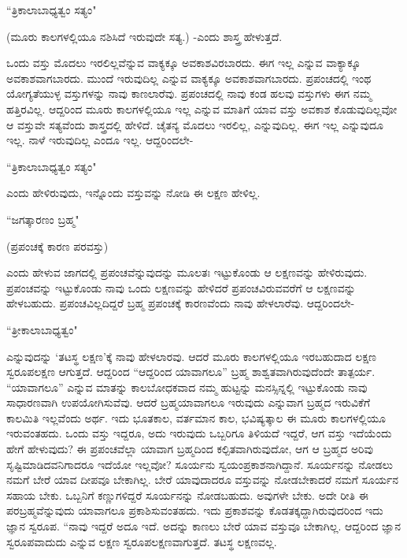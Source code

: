  \begin{shloka}
 ``ತ್ರಿಕಾಲಾಬಾಧ್ಯತ್ವಂ ಸತ್ಯಂ"
 \end{shloka}

(ಮೂರು ಕಾಲಗಳಲ್ಲಿಯೂ ನಶಿಸಿದೆ ಇರುವುದೇ ಸತ್ಯ.) -ಎಂದು ಶಾಸ್ತ್ರ ಹೇಳುತ್ತದೆ. 


ಒಂದು ವಸ್ತು ಮೊದಲು ಇರಲಿಲ್ಲವೆನ್ನುವ ವಾಕ್ಯಕ್ಕೂ ಅವಕಾಶವಿರಬಾರದು. ಈಗ  ಇಲ್ಲ ಎನ್ನುವ ವಾಕ್ಯಾಕ್ಕೂ ಅವಕಾಶವಾಗಬಾರದು. ಮುಂದೆ ಇರುವುದಿಲ್ಲ ಎನ್ನುವ ವಾಕ್ಯಕ್ಕೂ ಅವಕಾಶವಾಗಬಾರದು. ಪ್ರಪಂಚದಲ್ಲಿ ಇಂಥ ಯೋಗ್ಯತೆಯುಳ್ಳ ವಸ್ತುಗಳನ್ನು ನಾವು ಕಾಣಲಾರೆವು. ಪ್ರಪಂಚದಲ್ಲಿ ನಾವು ಕಂಡ ಹಲವು ವಸ್ತುಗಳು ಈಗ ನಮ್ಮ ಹತ್ತಿರವಿಲ್ಲ. ಆದ್ದರಿಂದ ಮೂರು ಕಾಲಗಳಲ್ಲಿಯೂ ಇಲ್ಲ ಎನ್ನುವ ಮಾತಿಗೆ ಯಾವ ವಸ್ತು ಅವಕಾಶ ಕೊಡುವುದಿಲ್ಲವೋ ಆ ವಸ್ತುವೇ ಸತ್ಯವೆಂದು ಶಾಸ್ತ್ರದಲ್ಲಿ  ಹೇಳಿದೆ. ಚೈತನ್ಯ  ಮೊದಲು ಇರಲಿಲ್ಲ, ಎನ್ನುವುದಿಲ್ಲ. ಈಗ ಇಲ್ಲ ಎನ್ನುವುದೂ ಇಲ್ಲ. ನಾಳೆ ಇರುವುದಿಲ್ಲ ಎಂದೂ ಇಲ್ಲ. ಆದ್ದರಿಂದಲೇ-

\begin{shloka}
``ತ್ರಿಕಾಲಾಬಾಧ್ಯತ್ವಂ ಸತ್ಯಂ"
\end{shloka}

ಎಂದು ಹೇಳಿರುವುದು, ಇನ್ನೊಂದು ವಸ್ತುವನ್ನು ನೋಡಿ ಈ ಲಕ್ಷಣ ಹೇಳಿಲ್ಲ.

\begin{shloka}
``ಜಗತ್ಕಾರಣಂ ಬ್ರಹ್ಮ"
\end{shloka}

(ಪ್ರಪಂಚಕ್ಕೆ ಕಾರಣ ಪರವಸ್ತು)

ಎಂದು ಹೇಳುವ ಜಾಗದಲ್ಲಿ ಪ್ರಪಂಚವೆನ್ನುವುದನ್ನು ಮೂಲತಃ ಇಟ್ಟುಕೊಂಡು ಆ  ಲಕ್ಷಣವನ್ನು ಹೇಳಿರುವುದು.  ಪ್ರಪಂಚವನ್ನು ಇಟ್ಟುಕೊಂಡು ನಾವು ಒಂದು ಲಕ್ಷಣವನ್ನು ಹೇಳಿದರೆ ಪ್ರಪಂಚವಿರುವವರೆಗೆ ಆ ಲಕ್ಷಣವನ್ನು ಹೇಳಬಹುದು. ಪ್ರಪಂಚವಿಲ್ಲದಿದ್ದರೆ ಬ್ರಹ್ಮ ಪ್ರಪಂಚಕ್ಕೆ ಕಾರಣವೆಂದು ನಾವು ಹೇಳಲಾರೆವು. ಆದ್ದರಿಂದಲೇ-


\begin{shloka}
``ತ್ರೀಕಾಲಾಬಾಧ್ಯತ್ವಂ"
\end{shloka}

ಎನ್ನುವುದನ್ನು `ತಟಸ್ಥ ಲಕ್ಷಣ'ಕ್ಕೆ ನಾವು ಹೇಳಲಾರವು. ಆದರೆ ಮೂರು ಕಾಲಗಳಲ್ಲಿಯೂ ಇರಬಹುದಾದ ಲಕ್ಷಣ ಸ್ವರೂಪಲಕ್ಷಣ ಆಗುತ್ತದೆ. ಆದ್ದರಿಂದ ``ಆದ್ದರಿಂದ ಯಾವಾಗಲೂ'' ಬ್ರಹ್ಮ ಶಾಶ್ವತವಾಗಿರುವುದೆಂದೇ ತಾತ್ಪರ್ಯ. ``ಯಾವಾಗಲೂ'' ಎನ್ನುವ ಮಾತನ್ನು ಕಾಲಬೋಧಕವಾದ ನಮ್ಮ ಹುಟ್ಟನ್ನು ಮನಸ್ಸಿನ್ನಲ್ಲಿ ಇಟ್ಟುಕೊಂಡು ನಾವು ಸಾಧಾರಣವಾಗಿ ಉಪಯೋಗಿಸುವೆವು. ಆದರೆ ಬ್ರಹ್ಮಯಾವಾಗಲೂ ಇರುವುದು  ಎನ್ನುವಾಗ ಬ್ರಹ್ಮದ ಇರುವಿಕೆಗೆ ಕಾಲಮಿತಿ ಇಲ್ಲವೆಂದು ಅರ್ಥ. ಇದು ಭೂತಕಾಲ, ವರ್ತಮಾನ ಕಾಲ, ಭವಿಷ್ಯತ್ಕಾಲ ಈ ಮೂರು ಕಾಲಗಳಲ್ಲಿಯೂ ಇರುವಂತಹದು. ಒಂದು ವಸ್ತು ಇದ್ದರೂ, ಅದು ಇರುವುದು ಒಬ್ಬರಿಗೂ ತಿಳಿಯದೆ ಇದ್ದರೆ, ಆಗ ವಸ್ತು ಇದೆಯೆಂದು ಹೇಗೆ ಹೇಳುವುದು? ಈ ಪ್ರಪಂಚವೆಲ್ಲಾ ಯಾವಾಗ ಬ್ರಹ್ಮದಿಂದ ಕಲ್ಪಿತವಾಗಿರುವುದೋ, ಆಗ ಆ ಬ್ರಹ್ಮದ ಅರಿವು ಸೃಷ್ಟಿಮಾಡಿದವನಿಗಾದರೂ ಇದೆಯೋ ಇಲ್ಲವೋ? ಸೂರ್ಯನು ಸ್ವಯಂಪ್ರಕಾಶನಾಗಿದ್ದಾನೆ. ಸೂರ್ಯನನ್ನು ನೋಡಲು ನಮಗೆ ಬೇರೆ ಯಾವ ದೀಪವೂ ಬೇಕಾಗಿಲ್ಲ. ಬೇರೆ ಯಾವುದಾದರೂ ವಸ್ತುವನ್ನು ನೋಡಬೇಕಾದರೆ ನಮಗೆ ಸೂರ್ಯನ ಸಹಾಯ ಬೇಕು. ಒಬ್ಬನಿಗೆ ಕಣ್ಣುಗಳಿದ್ದರೆ ಸೂರ್ಯನನ್ನು ನೋಡಬಹುದು. ಅವುಗಳೇ ಬೇಕು. ಅದೇ ರೀತಿ ಈ ಪರಬ್ರಹ್ಮವೆನ್ನುವುದು ಯಾವಾಗಲೂ ಪ್ರಕಾಶಿಸುವಂತಹದು. ಇದು ಪ್ರಕಾಶವನ್ನು ಕೊಡತಕ್ಕದ್ದಾಗಿರುವುದರಿಂದ ಇದು ಜ್ಞಾನ ಸ್ವರೂಪ. ``ನಾವು ಇದ್ದರೆ ಅದೂ ಇದೆ.  ಅದನ್ನು ಕಾಣಲು ಬೇರೆ ಯಾವ ವಸ್ತುವೂ  ಬೇಕಾಗಿಲ್ಲ. ಆದ್ದರಿಂದ ಜ್ಞಾನ ಸ್ವರೂಪವಾದುದು ಎನ್ನುವ ಲಕ್ಷಣ ಸ್ವರೂಪಲಕ್ಷಣವಾಗುತ್ತದೆ. ತಟಸ್ಥ ಲಕ್ಷಣವಲ್ಲ.

